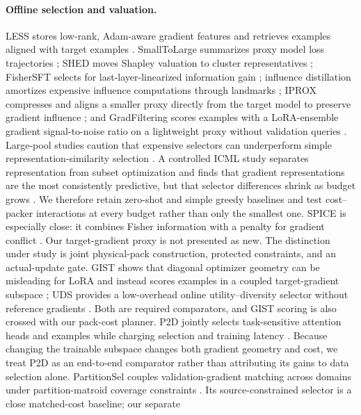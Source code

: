 \documentclass{article}
\begin{document}
\paragraph{Offline selection and valuation.}
LESS stores low-rank, Adam-aware gradient features and retrieves examples
aligned with target examples \cite{xia2024less}. SmallToLarge summarizes proxy
model loss trajectories \cite{yang2024smalltolarge}; SHED moves Shapley
valuation to cluster representatives \cite{he2024shed}; FisherSFT selects for
last-layer-linearized information gain \cite{deb2025fishersft}; influence
distillation amortizes expensive influence computations through landmarks
\cite{nikdan2025influence}; IPROX compresses and aligns a smaller proxy directly
from the target model to preserve gradient influence \cite{chen2026iprox}; and
GradFiltering scores examples with a LoRA-ensemble gradient signal-to-noise
ratio on a lightweight proxy without validation queries
\cite{yuan2026gradfiltering}. Large-pool studies caution that expensive selectors
can underperform simple representation-similarity selection
\cite{ivison2025largescale}.
A controlled ICML study separates representation from subset optimization and
finds that gradient representations are the most consistently predictive, but
that selector differences shrink as budget grows \cite{nayak2026critical}.
We therefore retain zero-shot and simple greedy baselines and test
cost--packer interactions at every budget rather than only the smallest one.
SPICE is especially close: it combines Fisher information with a penalty for
gradient conflict \cite{chang2026spice}. Our target-gradient proxy is not
presented as new. The distinction under study is joint physical-pack
construction, protected constraints, and an actual-update gate.
GIST shows that diagonal optimizer geometry can be misleading for LoRA and
instead scores examples in a coupled target-gradient subspace
\cite{min2026gist}; UDS provides a low-overhead online utility--diversity
selector without reference gradients \cite{zou2026uds}. Both are required
comparators, and GIST scoring is also crossed with our pack-cost planner.
P2D jointly selects task-sensitive attention heads and examples while charging
selection and training latency \cite{chen2026p2d}. Because changing the
trainable subspace changes both gradient geometry and cost, we treat P2D as an
end-to-end comparator rather than attributing its gains to data selection
alone.
PartitionSel couples validation-gradient matching across domains under
partition-matroid coverage constraints \cite{agrawal2026partitionsel}. Its
source-constrained selector is a close matched-cost baseline; our separate
\end{document}
